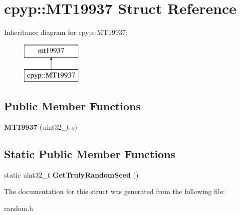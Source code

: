 \hypertarget{structcpyp_1_1_m_t19937}{}\section{cpyp\+:\+:MT19937 Struct Reference}
\label{structcpyp_1_1_m_t19937}
Inheritance diagram for cpyp\+:\+:MT19937\+:\begin{figure}[H]
\begin{center}
\leavevmode
\includegraphics[height=2.000000cm]{structcpyp_1_1_m_t19937}
\end{center}
\end{figure}
\subsection*{Public Member Functions}
\begin{DoxyCompactItemize}
\item 
\mbox{\label{structcpyp_1_1_m_t19937_aaaba5683758f3cdc63b2c35034aee5ed}} 
{\bfseries M\+T19937} (uint32\+\_\+t s)
\end{DoxyCompactItemize}
\subsection*{Static Public Member Functions}
\begin{DoxyCompactItemize}
\item 
\mbox{\label{structcpyp_1_1_m_t19937_a7f64402711c1e8c6d7ec0019414ac636}} 
static uint32\+\_\+t {\bfseries Get\+Truly\+Random\+Seed} ()
\end{DoxyCompactItemize}


The documentation for this struct was generated from the following file\+:\begin{DoxyCompactItemize}
\item 
random.\+h\end{DoxyCompactItemize}
